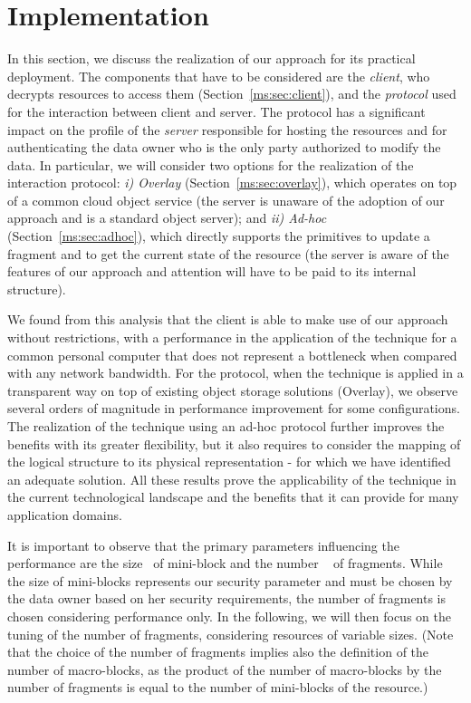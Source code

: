 \section{Implementation}\label{ms:sec:expe}
In this section, we discuss the realization of our approach for its practical deployment. The components that have to be considered are the {\em client\/}, who decrypts resources to access them (Section~\ref{ms:sec:client}), and the {\em protocol\/} used for the interaction between client and server. The protocol has a significant impact on the profile of the {\em server\/} responsible for hosting the resources and for authenticating the data owner who is the only party authorized to modify the data. In particular, we will consider two options for the realization of the interaction protocol: {\em i) Overlay\/} (Section~\ref{ms:sec:overlay}), which operates on top of a common cloud object service (the server is unaware of the adoption of our approach and is a standard object server); and {\em ii) Ad-hoc} (Section~\ref{ms:sec:adhoc}), which directly supports the primitives to update a fragment and to get the current state of the resource (the server is aware of the features of our approach and attention will have to be paid to its internal structure).
 
We found from this analysis that the client is able to make use of our approach without restrictions, with a performance in the application of the technique for a common personal computer that does not represent a bottleneck when compared with any network bandwidth. For the protocol, when the technique is applied in a transparent way on top of existing object storage solutions (Overlay), we observe several orders of magnitude in performance improvement for some configurations. The realization of the technique using an ad-hoc protocol further improves the benefits with its greater flexibility, but it also requires to consider the mapping of the logical structure to its physical representation - for which we have identified an adequate solution. All these results prove the applicability of the technique in the current technological landscape and the benefits that it can provide for many application domains.

It is important to observe that the primary parameters influencing the performance are the size \msize\ of mini-block and the number \fnum\ \! of fragments. While the size of mini-blocks represents our security parameter and must be chosen by the data owner based on her security requirements, the number of fragments is chosen considering performance only. In the following, we will then focus on the tuning of the number of fragments, considering resources of variable sizes. (Note that the choice of the number of fragments implies also the definition of the number of macro-blocks, as the product of the number of macro-blocks by the number of fragments is equal to the number of mini-blocks of the resource.)

